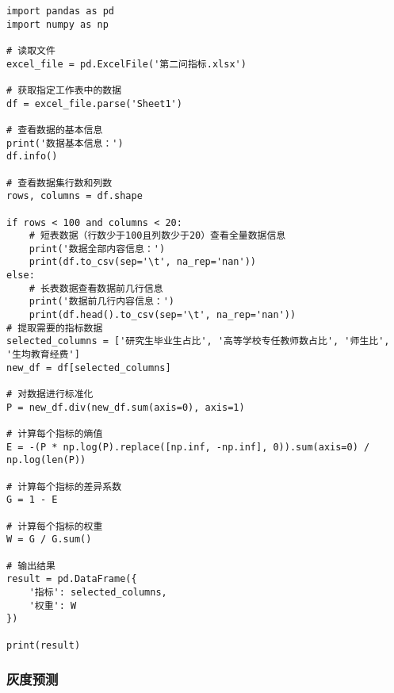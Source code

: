 \documentclass[withoutpreface,bwprint]{cumcmthesis} %
\begin{document}
\begin{verbatim}
import pandas as pd
import numpy as np

# 读取文件
excel_file = pd.ExcelFile('第二问指标.xlsx')

# 获取指定工作表中的数据
df = excel_file.parse('Sheet1')

# 查看数据的基本信息
print('数据基本信息：')
df.info()

# 查看数据集行数和列数
rows, columns = df.shape

if rows < 100 and columns < 20:
    # 短表数据（行数少于100且列数少于20）查看全量数据信息
    print('数据全部内容信息：')
    print(df.to_csv(sep='\t', na_rep='nan'))
else:
    # 长表数据查看数据前几行信息
    print('数据前几行内容信息：')
    print(df.head().to_csv(sep='\t', na_rep='nan'))
# 提取需要的指标数据
selected_columns = ['研究生毕业生占比', '高等学校专任教师数占比', '师生比', '生均教育经费']
new_df = df[selected_columns]

# 对数据进行标准化
P = new_df.div(new_df.sum(axis=0), axis=1)

# 计算每个指标的熵值
E = -(P * np.log(P).replace([np.inf, -np.inf], 0)).sum(axis=0) / np.log(len(P))

# 计算每个指标的差异系数
G = 1 - E

# 计算每个指标的权重
W = G / G.sum()

# 输出结果
result = pd.DataFrame({
    '指标': selected_columns,
    '权重': W
})

print(result)
\end{verbatim}

\subsubsection{灰度预测}
\end{document}
